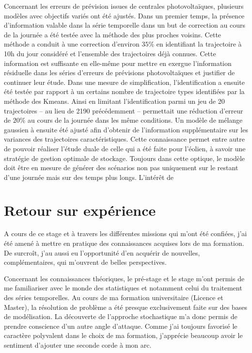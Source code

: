 \documentclass[12pt, french]{report}
\begin{document}
Concernant les erreurs de prévision issues de centrales photovoltaïques, plusieurs modèles avec objectifs variés ont été ajustés. Dans un premier temps, la présence d'information valable dans la série temporelle dans un but de correction au cours de la journée a été testée avec la méthode des plus proches voisins. Cette méthode a conduit à une correction d'environ $35 \%$ en identifiant la trajectoire à 10h du jour considéré et l'ensemble des trajectoires déjà connues. Cette information est suffisante en elle-même pour mettre en exergue l'information résiduelle dans les séries d'erreurs de prévisions photovoltaïques et justifier de continuer leur étude. Dans une mesure de simplification, l'identification a ensuite été testée par rapport à un certains nombre de trajectoire types identifiées par la méthode des Kmeans. Ainsi en limitant l'identification parmi un jeu de 20 trajectoires -- au lieu de 2190 précédemment -- permettait une réduction d'erreur de $20 \%$ au cours de la journée dans les même conditions. Un modèle de mélange gaussien à ensuite été ajusté afin d'obtenir de l'information supplémentaire sur les variances des trajectoires caractéristiques. Cette connaissance permet entre autre de pouvoir réaliser l'étude duale de celle qui a été faite pour l'éolien, à savoir une stratégie de gestion optimale de stockage. Toujours dans cette optique, le modèle doit être en mesure de générer des scénarios non pas uniquement sur le restant d'une journée mais sur des temps plus longs. L'intérêt de 


\chapter{Retour sur expérience}





A cours de ce stage et à travers les différentes missions qui m'ont été confiées, j'ai été amené à mettre en pratique des connaissances acquises lors de ma formation. De surcroît, j'au aussi eu l'opportunité d'en acquérir de nouvelles, complémentaires, qui m'ouvrent de belles perspectives.

Concernant les connaissances théoriques, le pré-stage et le stage m'ont permis de me familiariser avec le monde des statistiques et notamment celui du traitement des séries temporelles. Au cours de ma formation universitaire (Licence et Master), la résolution de problème a été presque exclusivement faite sur des bases de modélisation. La découverte de l'approche stochastique m'a donc permis de prendre conscience d'un autre angle d'attaque. Comme j'ai toujours favorisé le caractère polyvalent dans le choix de ma formation, j'apprécie beaucoup avoir le sentiment d'ajouter une seconde corde à mon arc.
\end{document}
